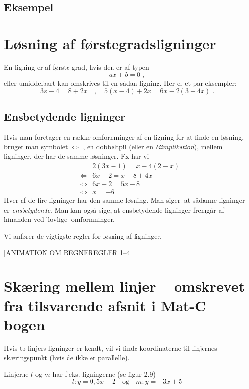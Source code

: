 \documentclass[12pt,oneside,a4paper]{article}
\newcommand{\bas}{\begin{eqnarray*}}
\newcommand{\eas}{\end{eqnarray*}}
\begin{document}
\subsection{Eksempel}






\section{Løsning af førstegradsligninger}
En ligning er af første grad, hvis den er af typen
$$
ax + b = 0\; ,
$$
eller umiddelbart kan omskrives til en sådan ligning. Her er et par eksempler:
$$
3x - 4 = 8 + 2x \quad , \quad 5(x - 4) + 2x = 6x - 2(3 - 4x)\; .
$$

\subsection{Ensbetydende ligninger}
Hvis man foretager en række omformninger af en ligning for at finde en løsning,
bruger man symbolet $\Leftrightarrow$ , en dobbeltpil (eller en {\em biimplikation}), mellem
ligninger, der har de samme løsninger. Fx har vi
\bas
&& 2(3x - 1) = x - 4(2 - x)\\
&\Leftrightarrow& 6x - 2 = x - 8 + 4x\\
&\Leftrightarrow& 6x - 2 = 5x - 8 \\
&\Leftrightarrow& x = -6 
\eas
Hver af de fire ligninger har den samme løsning. Man siger, at sådanne
ligninger er {\em ensbetydende}. Man kan også sige, at ensbetydende ligninger fremgår
af hinanden ved ’lovlige’ omformninger.

Vi anfører de vigtigste regler for løsning af ligninger.

[ANIMATION OM REGNEREGLER 1--4]



\section{Skæring mellem linjer -- omskrevet fra tilsvarende afsnit i Mat-C bogen}
Hvis to linjers ligninger er kendt, vil vi finde koordinaterne til linjernes
skæringspunkt (hvis de ikke er parallelle).

Linjerne $l$ og $m$ har f.eks. ligningerne (se figur 2.9)
\[
    l: y=0,5x-2\quad{\mbox{og}}\quad m: y=-3x+5
\]
\end{document}
